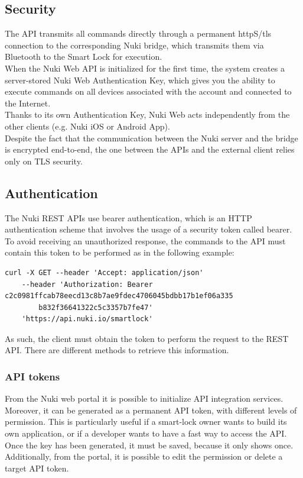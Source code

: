 \subsection{Security}
The API transmits all commands directly through a permanent \acrshort{http}S/\acrshort{tls} connection to the corresponding Nuki bridge, which transmits them via Bluetooth to the Smart Lock for execution\cite{nukiapidocs}. \\
When the Nuki Web API is initialized for the first time, the system creates a server-stored Nuki Web Authentication Key, which gives you the ability to execute commands on all devices associated with the account and connected to the Internet. \\
Thanks to its own Authentication Key, Nuki Web acts independently from the other clients (e.g. Nuki iOS or Android App). 
\\ Despite the fact that the communication between the Nuki server and the bridge is encrypted end-to-end, the one between the APIs and the external client relies only on TLS security.

\subsection{Authentication}
The Nuki REST APIs use bearer authentication, which is an HTTP authentication scheme that involves the usage of a security token called bearer. To avoid receiving an unauthorized response, the commands to the API must contain this token to be performed as in the following example:

\begin{lstlisting}[breaklines, caption={Simple curl command towards the Nuki web API with bearer token.}, style=curl]
    curl -X GET --header 'Accept: application/json' 
    --header 'Authorization: Bearer c2c0981ffcab78eecd13c8b7ae9fdec4706045bdbb17b1ef06a335
        b832f36641322c5c3357b7fe47' 
    'https://api.nuki.io/smartlock'
\end{lstlisting}

As such, the client must obtain the token to perform the request to the REST API. There are different methods to retrieve this information.
\subsubsection{API tokens}
From the Nuki web portal it is possible to initialize API integration services. Moreover, it can be generated as a permanent API token, with different levels of permission. This is particularly useful if a smart-lock owner wants to build its own application, or if a developer wants to have a fast way to access the API.
\\ Once the key has been generated, it must be saved, because it only shows once. Additionally, from the portal, it is possible to edit the permission or delete a target API token.


